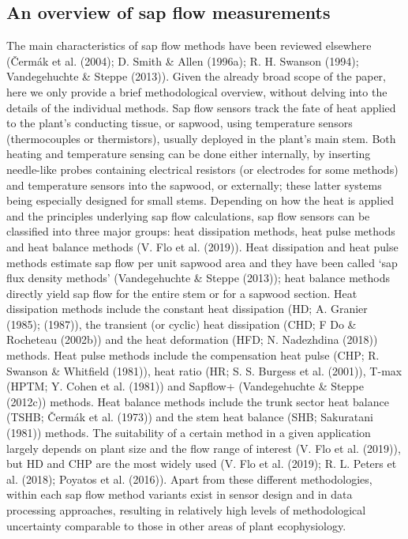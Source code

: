 \documentclass[11pt,twoside]{reedthesis}
\begin{document}
\subsection{An overview of sap flow
measurements}\label{an-overview-of-sap-flow-measurements}

The main characteristics of sap flow methods have been reviewed
elsewhere (Čermák et al. (2004); D. Smith \& Allen (1996a); R. H.
Swanson (1994); Vandegehuchte \& Steppe (2013)). Given the already broad
scope of the paper, here we only provide a brief methodological
overview, without delving into the details of the individual methods.
Sap flow sensors track the fate of heat applied to the plant's
conducting tissue, or sapwood, using temperature sensors (thermocouples
or thermistors), usually deployed in the plant's main stem. Both heating
and temperature sensing can be done either internally, by inserting
needle-like probes containing electrical resistors (or electrodes for
some methods) and temperature sensors into the sapwood, or externally;
these latter systems being especially designed for small stems.
Depending on how the heat is applied and the principles underlying sap
flow calculations, sap flow sensors can be classified into three major
groups: heat dissipation methods, heat pulse methods and heat balance
methods (V. Flo et al. (2019)). Heat dissipation and heat pulse methods
estimate sap flow per unit sapwood area and they have been called `sap
flux density methods' (Vandegehuchte \& Steppe (2013)); heat balance
methods directly yield sap flow for the entire stem or for a sapwood
section. Heat dissipation methods include the constant heat dissipation
(HD; A. Granier (1985); (1987)), the transient (or cyclic) heat
dissipation (CHD; F Do \& Rocheteau (2002b)) and the heat deformation
(HFD; N. Nadezhdina (2018)) methods. Heat pulse methods include the
compensation heat pulse (CHP; R. Swanson \& Whitfield (1981)), heat
ratio (HR; S. S. Burgess et al. (2001)), T-max (HPTM; Y. Cohen et al.
(1981)) and Sapflow+ (Vandegehuchte \& Steppe (2012c)) methods. Heat
balance methods include the trunk sector heat balance (TSHB; Čermák et
al. (1973)) and the stem heat balance (SHB; Sakuratani (1981)) methods.
The suitability of a certain method in a given application largely
depends on plant size and the flow range of interest (V. Flo et al.
(2019)), but HD and CHP are the most widely used (V. Flo et al. (2019);
R. L. Peters et al. (2018); Poyatos et al. (2016)). Apart from these
different methodologies, within each sap flow method variants exist in
sensor design and in data processing approaches, resulting in relatively
high levels of methodological uncertainty comparable to those in other
areas of plant ecophysiology.\par
\end{document}
